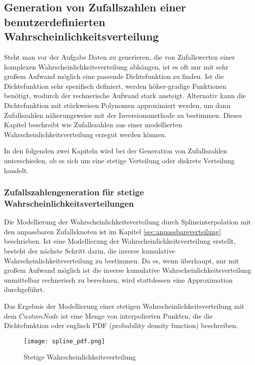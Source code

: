 \subsection{Generation von Zufallszahlen einer benutzerdefinierten Wahrscheinlichkeitsverteilung}
\label{sec:anpassbareverteilungberechnung}

Steht man vor der Aufgabe Daten zu generieren, die von Zufallswerten einer komplexen Wahrscheinlichkeitsverteilung abhängen, ist es oft nur mit sehr großem Aufwand möglich eine passende Dichtefunktion zu finden. Ist die Dichtefunktion sehr spezifisch definiert, werden höher-gradige Funktionen benötigt, wodurch der rechnerische Aufwand stark ansteigt. Alternativ kann die Dichtefunktion mit stückweisen Polynomen approximiert werden, um dann Zufallszahlen näherungsweise mit der Inversionsmethode zu bestimmen. Dieses Kapitel beschreibt wie Zufallszahlen aus einer modellierten Wahrscheinlichkeitsverteilung erzegut werden können.

In den folgenden zwei Kapiteln wird bei der Generation von Zufallszahlen unterschieden, ob es sich um eine stetige Verteilung oder diskrete Verteilung handelt.

\subsubsection{Zufallszahlengeneration für stetige Wahrscheinlichkeitsverteilungen}

Die Modellierung der Wahrscheinlichkeitsverteilung durch Splineinterpolation mit den anpassbaren Zufallsknoten ist im Kapitel \ref{sec:anpassbareverteilung} beschrieben. Ist eine Modellierung der Wahrscheinlichkeitsverteilung erstellt, besteht der nächste Schritt darin, die inverse kumulative Wahrscheinlichkeitsverteilung zu bestimmen. Da es, wenn überhaupt, nur mit großem Aufwand möglich ist die inverse kumulative Wahrscheinlichkeitsverteilung unmittelbar rechnerisch zu berechnen, wird stattdessen eine Approximation durchgeführt. 

Das Ergebnis der Modellierung einer stetigen Wahrscheinlichkeitsverteilung mit dem $CustomNode$ ist eine Menge von interpolierten Punkten, die die Dichtefunktion oder englisch PDF (probability density function) beschreiben. 

\begin{figure}[H]
    \centering
    \texttt{[image: spline\_pdf.png]}
    \caption{Stetige Wahrscheinlichkeitsverteilung}\label{fig:pdf}
\end{figure}

